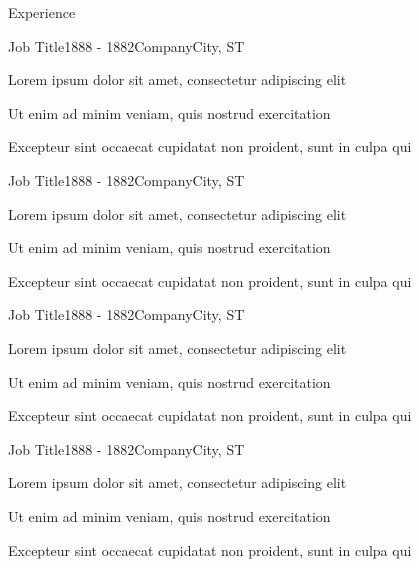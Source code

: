 \documentclass{structure} %
\begin{document}
\begin{rSection}{Experience}

\begin{rSubsection}{Job Title}{1888 - 1882}{Company}{City, ST}
\item Lorem ipsum dolor sit amet, consectetur adipiscing elit
\item Ut enim ad minim veniam, quis nostrud exercitation
\item Excepteur sint occaecat cupidatat non proident, sunt in culpa qui
\end{rSubsection}


\begin{rSubsection}{Job Title}{1888 - 1882}{Company}{City, ST}
\item Lorem ipsum dolor sit amet, consectetur adipiscing elit
\item Ut enim ad minim veniam, quis nostrud exercitation
\item Excepteur sint occaecat cupidatat non proident, sunt in culpa qui
\end{rSubsection}


\begin{rSubsection}{Job Title}{1888 - 1882}{Company}{City, ST}
\item Lorem ipsum dolor sit amet, consectetur adipiscing elit
\item Ut enim ad minim veniam, quis nostrud exercitation
\item Excepteur sint occaecat cupidatat non proident, sunt in culpa qui
\end{rSubsection}


\begin{rSubsection}{Job Title}{1888 - 1882}{Company}{City, ST}
\item Lorem ipsum dolor sit amet, consectetur adipiscing elit
\item Ut enim ad minim veniam, quis nostrud exercitation
\item Excepteur sint occaecat cupidatat non proident, sunt in culpa qui
\end{rSubsection}

\end{rSection}

\end{document}
